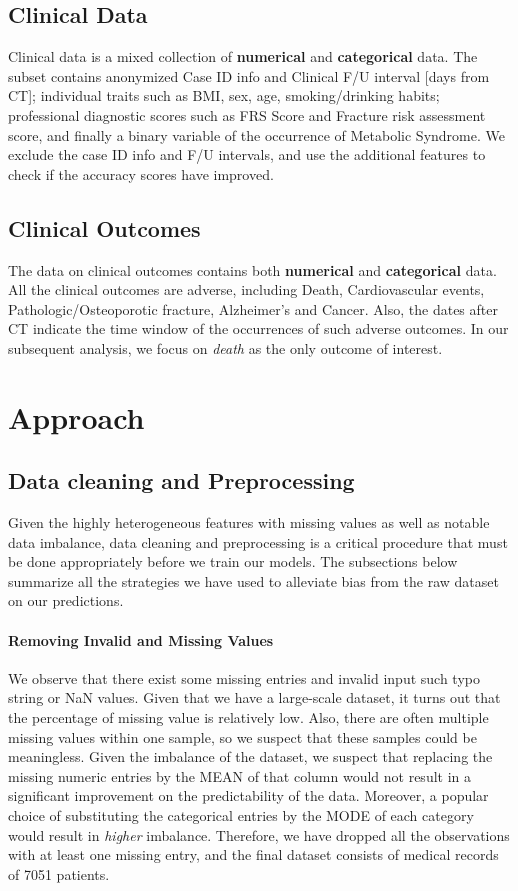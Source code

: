\documentclass{article}
\begin{document}
\subsection{Clinical Data}
Clinical data is a mixed collection of \textbf{numerical} and \textbf{categorical} data. The subset contains anonymized Case ID info and Clinical F/U interval [days from CT]; individual traits such as BMI, sex, age, smoking/drinking habits; professional diagnostic scores such as FRS Score and Fracture risk assessment score, and finally a binary variable of the occurrence of Metabolic Syndrome. We exclude the case ID info and F/U intervals, and use the additional features to check if the accuracy scores have improved.  

\subsection{Clinical Outcomes}
The data on clinical outcomes contains both \textbf{numerical} and \textbf{categorical} data. All the clinical outcomes are adverse, including Death, Cardiovascular events, Pathologic/Osteoporotic fracture, Alzheimer’s and Cancer. Also, the dates after CT indicate the time window of the occurrences of such adverse outcomes. In our subsequent analysis, we focus on \textit{death} as the only outcome of interest. 

\section{Approach}

\subsection{Data cleaning and Preprocessing}

Given the highly heterogeneous features with missing values as well as notable data imbalance, data cleaning and preprocessing is a critical procedure that must be done appropriately before we train our models. The subsections below summarize all the strategies we have used to alleviate bias from the raw dataset on our predictions.

\paragraph{Removing Invalid and Missing Values}

We observe that there exist some missing entries and invalid input such typo string or NaN values. Given that we have a large-scale dataset, it turns out that the percentage of missing value is relatively low. Also, there are often multiple missing values within one sample, so we suspect that these samples could be meaningless. Given the imbalance of the dataset, we suspect that replacing the missing numeric entries by the MEAN of that column would not result in a significant improvement on the predictability of the data. Moreover, a popular choice of substituting the categorical entries by the MODE of each category would result in \textit{higher} imbalance. Therefore, we have dropped all the observations with at least one missing entry, and the final dataset consists of medical records of 7051 patients.
\end{document}

